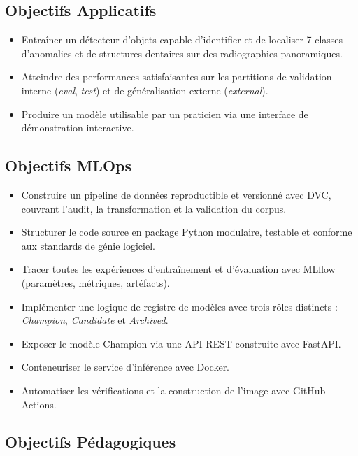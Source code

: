 \documentclass{rapportENSIAS}
\begin{document}
\subsection{Objectifs Applicatifs}

\begin{itemize}
    \item Entraîner un détecteur d'objets capable d'identifier et de localiser 7 classes d'anomalies et de structures dentaires sur des radiographies panoramiques.
    \item Atteindre des performances satisfaisantes sur les partitions de validation interne (\textit{eval}, \textit{test}) et de généralisation externe (\textit{external}).
    \item Produire un modèle utilisable par un praticien via une interface de démonstration interactive.
\end{itemize}

\subsection{Objectifs MLOps}

\begin{itemize}
    \item Construire un pipeline de données reproductible et versionné avec DVC, couvrant l'audit, la transformation et la validation du corpus.
    \item Structurer le code source en package Python modulaire, testable et conforme aux standards de génie logiciel.
    \item Tracer toutes les expériences d'entraînement et d'évaluation avec MLflow (paramètres, métriques, artéfacts).
    \item Implémenter une logique de registre de modèles avec trois rôles distincts : \textit{Champion}, \textit{Candidate} et \textit{Archived}.
    \item Exposer le modèle Champion via une API REST construite avec FastAPI.
    \item Conteneuriser le service d'inférence avec Docker.
    \item Automatiser les vérifications et la construction de l'image avec GitHub Actions.
\end{itemize}

\subsection{Objectifs Pédagogiques}
\end{document}
